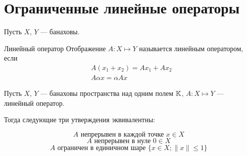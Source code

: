 \section{Ограниченные линейные операторы}

Пусть $X$, $Y$ --- банаховы.

\begin{dfn}{Линейный оператор}
  Отображение $A : X \mapsto Y$ называется линейным оператором, если
  \begin{align*}
    & A (x_1 + x_2) = A x_1 + A x_2 \\
    & A \alpha x = \alpha A x
  \end{align*}
\end{dfn}

\begin{thm}
\label{th:l-b-def-equiv}
Пусть $X$, $Y$ --- банаховы пространства над одним полем $\mathbb{K}$,
$A : X \mapsto Y$ --- линейный оператор.

Тогда следующие три утверждения эквивалентны:

\begin{equation} \label{eq:lb-1}
  A \text{ непрерывен в каждой точке } x\in X \end{equation}
\begin{equation} \label{eq:lb-2}
  A \text{ непрерывен в нуле } 0\in X \end{equation}
\begin{equation} \label{eq:lb-3}
  A \text{ ограничен в единичном шаре } \{x\in X ; \|x\|\leq 1\} \end{equation}
\end{thm}
